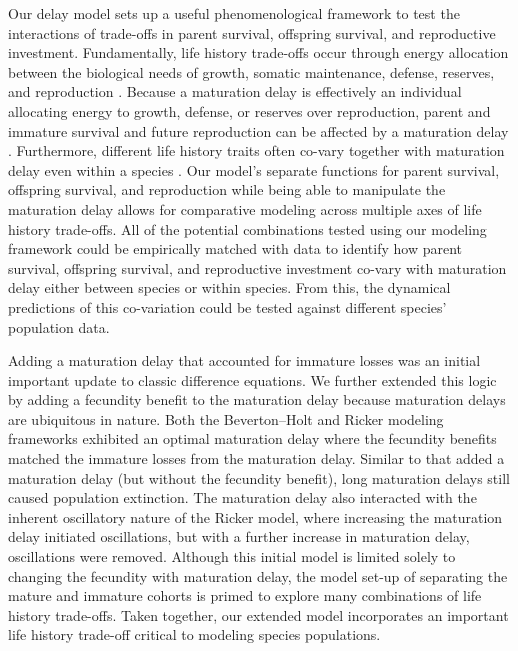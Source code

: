 \documentclass{article}
\numberwithin{theorem}{section}
\begin{document}
{Our delay model sets up a useful phenomenological framework to test the interactions of trade-offs in parent survival, offspring survival, and reproductive investment. Fundamentally, life history trade-offs occur through energy allocation between the biological needs of growth, somatic maintenance, defense, reserves, and reproduction \cite{zeraPhysiologyLifeHistory2001a}. Because a maturation delay is effectively an individual allocating energy to growth, defense, or reserves over reproduction, parent and immature survival and future reproduction can be affected by a maturation delay \cite{zeraPhysiologyLifeHistory2001a}. Furthermore, different life history traits often co-vary together with maturation delay even within a species \cite{purchaseSexspecificCovariationLifehistory2005}. Our model's separate functions for parent survival, offspring survival, and reproduction while being able to manipulate the maturation delay allows for comparative modeling across multiple axes of life history trade-offs. All of the potential combinations tested using our modeling framework could be empirically matched with data to identify how parent survival, offspring survival, and reproductive investment co-vary with maturation delay either between species or within species. From this, the dynamical predictions of this co-variation could be tested against different species' population data.

Adding a maturation delay that accounted for immature losses was an initial important update to classic difference equations. We further extended this logic by adding a fecundity benefit to the maturation delay because maturation delays are ubiquitous in nature. Both the Beverton--Holt and Ricker modeling frameworks exhibited an optimal maturation delay where the fecundity benefits matched the immature losses from the maturation delay. Similar to \cite{StWodelay2, StWodelay3} that added a maturation delay (but without the fecundity benefit), long maturation delays still caused population extinction. The maturation delay also interacted with the inherent oscillatory nature of the Ricker model, where increasing the maturation delay initiated oscillations, but with a further increase in maturation delay, oscillations were removed. Although this initial model is limited solely to changing the fecundity with maturation delay, the model set-up of separating the mature and immature cohorts is primed to explore many combinations of life history trade-offs. Taken together, our extended model incorporates an important life history trade-off critical to modeling species populations.

}
\end{document}
